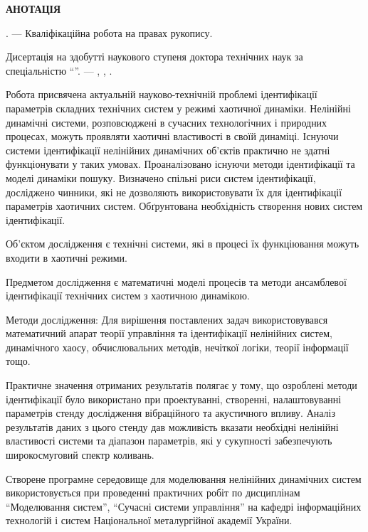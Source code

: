\clearpage

{}

\begin{center}
\textbf{АНОТАЦІЯ}
\end{center}

\medskip

\textit{\dissauthorUa} \booknameUa.
--- Кваліфікаційна робота на правах рукопису.

Дисертація на здобутті наукового ступеня доктора технічних наук за спеціальністю
\dissSpecId ``\dissSpecUa''. --- \institutionUa, \belongUa, \bookyear.


Робота присвячена актуальній науково-технічній проблемі
ідентифікації параметрів складних технічних систем у режимі хаотичної динаміки.
Нелінійні динамічні системи, розповсюджені в сучасних технологічних і
природних процесах, можуть проявляти хаотичні властивості в своїй динаміці.
Існуючи системи ідентифікації нелінійних динамічних об'єктів практично не
здатні функціонувати у таких умовах.
Проаналізовано існуючи методи ідентифікації та моделі динаміки пошуку.
Визначено спільні риси систем ідентифікації,
досліджено чинники, які не дозволяють використовувати їх
для ідентифікації параметрів хаотичних систем.
Обґрунтована необхідність створення нових систем ідентифікації.

Об'єктом дослідження є 
технічні системи, які в процесі їх функціювання можуть
входити в хаотичні режими.

Предметом дослідження є
математичні моделі процесів та методи
ансамблевої ідентифікації технічних систем з хаотичною динамікою.

Методи дослідження:
Для вирішення поставлених задач використовувався математичний апарат
теорії управління та ідентифікації нелінійних систем, динамічного хаосу,
обчислювальних методів, нечіткої логіки, теорії інформації тощо.

Практичне значення отриманих результатів полягає у тому,
що озроблені методи ідентифікації було використано
при проектуванні, створенні, налаштовуванні параметрів
стенду дослідження вібраційного та акустичного впливу.
Аналіз результатів даних з цього стенду
дав можливість вказати необхідні нелінійні властивості системи
та діапазон параметрів, які у сукупності
забезпечують широкосмуговий спектр коливань.

Створене програмне середовище для моделювання нелінійних динамічних систем
використовується при проведенні практичних робіт по дисциплінам
``Моделювання систем'',
``Сучасні системи управління'' на кафедрі інформаційних технологій
і систем Національної металургійної академії України.

